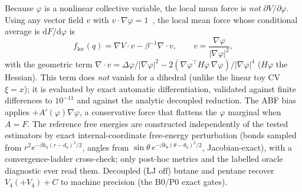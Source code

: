 Because $\varphi$ is a nonlinear collective variable, the local mean force is
\emph{not} $\partial V/\partial\varphi$. Using any vector field $v$ with
$v\cdot\nabla\varphi=1$~\citep{DenOtterBriels1998,CiccottiKapralVandenEijnden2005},
the local mean force whose conditional average is $\mathrm{d}F/\mathrm{d}\varphi$ is
\begin{equation}
  f_{\mathrm{loc}}(q)=\nabla V\cdot v-\beta^{-1}\nabla\cdot v ,\qquad
  v=\frac{\nabla\varphi}{\lvert\nabla\varphi\rvert^2},
  \label{eq:genforce}
\end{equation}
with the geometric term
$\nabla\cdot v=\Delta\varphi/\lvert\nabla\varphi\rvert^2
-2(\nabla\varphi^{\!\top}H\varphi\,\nabla\varphi)/\lvert\nabla\varphi\rvert^4$
($H\varphi$ the Hessian). This term does \emph{not} vanish for a dihedral (unlike
the linear toy CV $\xi=x$); it is evaluated by exact automatic differentiation,
validated against finite differences to $10^{-11}$ and against the analytic
decoupled reduction. The ABF bias applies $+A'(\varphi)\nabla\varphi$, a
conservative force that flattens the $\varphi$ marginal when $A=F$. The reference
free energies are constructed independently of the tested estimators by exact
internal-coordinate free-energy perturbation (bonds sampled from
$r^2e^{-\beta k_0(r-d_0)^2/2}$, angles from $\sin\theta\,e^{-\beta k_\theta(\theta-\theta_0)^2/2}$,
Jacobian-exact), with a convergence-ladder cross-check; only post-hoc metrics and the
labelled oracle diagnostic ever read them. Decoupled ($\text{LJ off}$) butane and
pentane recover $V_4(+V_4)+C$ to machine precision (the B0/P0 exact gates).
